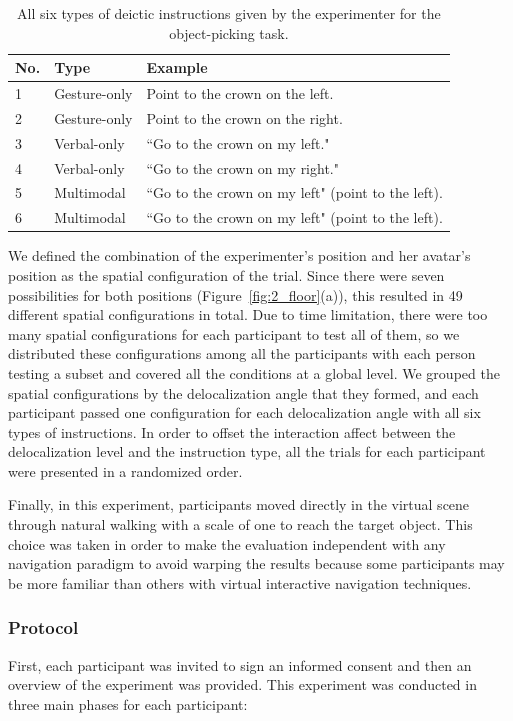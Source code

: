 \begin{table}[!t]
\renewcommand{\arraystretch}{1.3}
\caption{All six types of deictic instructions given by the experimenter for the object-picking task.}
\label{tab:instruction_type}
\centering
\begin{tabular}{l l l}
	\hline
	No. & Type & Example \\
	\hline
    1 & Gesture-only & Point to the crown on the left. \\
    2 & Gesture-only & Point to the crown on the right. \\
    3 & Verbal-only & ``Go to the crown on my left." \\
    4 & Verbal-only & ``Go to the crown on my right." \\
    5 & Multimodal & ``Go to the crown on my left" (point to the left). \\
    6 & Multimodal & ``Go to the crown on my left" (point to the left). \\ \hline
\end{tabular}
\end{table}

We defined the combination of the experimenter's position and her avatar's position as the spatial configuration of the trial. Since there were seven possibilities for both positions (Figure~\ref{fig:2_floor}(a)), this resulted in 49 different spatial configurations in total. Due to time limitation, there were too many spatial configurations for each participant to test all of them, so we distributed these configurations among all the participants with each person testing a subset and covered all the conditions at a global level. We grouped the spatial configurations by the delocalization angle that they formed, and each participant passed one configuration for each delocalization angle with all six types of instructions. In order to offset the interaction affect between the delocalization level and the instruction type, all the trials for each participant were presented in a randomized order.

Finally, in this experiment, participants moved directly in the virtual scene through natural walking with a scale of one to reach the target object. This choice was taken in order to make the evaluation independent with any navigation paradigm to avoid warping the results because some participants may be more familiar than others with virtual interactive navigation techniques.


\subsubsection{Protocol}
First, each participant was invited to sign an informed consent and then an overview of the experiment was provided. This experiment was conducted in three main phases for each participant:

